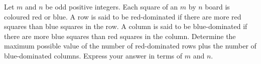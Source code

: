 Let $m$ and $n$ be odd positive integers. Each square of an $m$ by $n$ board is coloured red or blue. A row is said to be red-dominated if there are more red squares than blue squares in the row. A column is said to be blue-dominated if there are more blue squares than red squares in the column. Determine the maximum possible value of the number of red-dominated rows plus the number of blue-dominated columns. Express your answer in terms of $m$ and $n$.